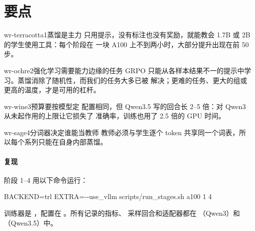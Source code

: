 \documentclass[11pt,a4paper,fontset=none]{ctexart}
\begin{document}
\section{要点}

\begin{tcbraster}[raster columns=2, raster equal height,
    raster column skip=4mm, raster row skip=4mm]
\begin{card}{wr-terracotta}{1\enspace 蒸馏是主力}
只用提示，没有标注也没有奖励，就能教会 1.7B 或 2B 的学生使用工具：每个阶段在
一块 A100 上不到两小时，大部分提升出现在前 50 步。
\end{card}
\begin{card}{wr-ochre}{2\enspace 强化学习需要能力边缘的任务}
GRPO 只能从各样本结果不一的提示中学习。蒸馏消除了随机性，而我们的任务大多已被
解决；更难的任务、更大的组或更高的温度，才是可用的杠杆。
\end{card}
\begin{card}{wr-wine}{3\enspace 预算要按模型定}
配置相同，但 Qwen3.5 写的回合长 2--5 倍：对 Qwen3 从未起作用的上限让它损失了
准确率，训练也用了 2.5 倍的 GPU 时间。
\end{card}
\begin{card}{wr-sage}{4\enspace 分词器决定谁能当教师}
教师必须与学生逐个 token 共享同一个词表，所以每个系列只能在自身内部蒸馏。
\end{card}
\end{tcbraster}

\paragraph{复现}
阶段 1--4 用以下命令运行：
\begin{codebox}
BACKEND=trl EXTRA=-{}-use\_vllm scripts/run\_stages.sh a100 1 4
\end{codebox}
\noindent 训练器是 ，配置在 。所有记录的指标、
采样回合和适配器都在 （Qwen3）和
（Qwen3.5）中。
\end{document}
